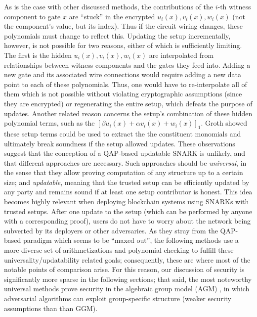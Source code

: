 \noindent As is the case with other discussed methods, the contributions of the $i$-th witness component to gate $x$ are ``stuck'' in the encrypted $u_i(x), v_i(x), w_i(x)$ (not the component's value, but its index). Thus if the circuit wiring changes, these polynomials must change to reflect this. Updating the setup incrementally, however, is not possible for two reasons, either of which is sufficiently limiting. The first is the hidden $u_i(x), v_i(x), w_i(x)$ are interpolated from relationships between witness components and the gates they feed into. Adding a new gate and its associated wire connections would require adding a new data point to each of these polynomials. Thus, one would have to re-interpolate all of them which is not possible without violating cryptographic assumptions (since they are encrypted) or regenerating the entire setup, which defeats the purpose of updates. Another related reason concerns the setup's combination of these hidden polynomial terms, such as the $[\beta u_i(x) + \alpha v_i(x) + w_i(x)]_1$. Groth \cite{grothupdatable} showed these setup terms could be used to extract the the constituent monomials and ultimately break soundness if the setup allowed updates. These observations suggest that the conception of a QAP-based updatable SNARK is unlikely, and that different approaches are necessary. Such approaches should be \textit{universal}, in the sense that they allow proving computation of any structure up to a certain size; and \textit{updatable}, meaning that the trusted setup can be efficiently updated by any party and remains sound if at least one setup contributor is honest. This idea becomes highly relevant when deploying blockchain systems using SNARKs with trusted setups. After one update to the setup (which can be performed by anyone with a corresponding proof), users do not have to worry about the network being subverted by its deployers or other adversaries. As they stray from the QAP-based paradigm which seems to be ``maxed out'', the following methods use a more diverse set of arithmetizations and polynomial checking to fulfill these universality/updatability related goals; consequently, these are where most of the notable points of comparison arise. For this reason, our discussion of security is significantly more sparse in the following sections; that said, the most noteworthy universal methods prove security in the algebraic group model (AGM) \cite{agm}, in which adversarial algorithms can exploit group-specific structure (weaker security assumptions than than GGM). \\

